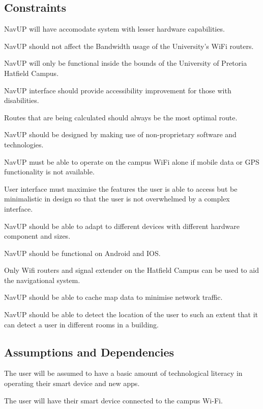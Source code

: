 \documentclass[12pt,a4paper]{article}
\begin{document}
	\subsection{Constraints}
		\begin{ConstraintEnum}
			\item NavUP will have accomodate system with lesser hardware capabilities.
			\item NavUP should not affect the Bandwidth usage of the University’s WiFi routers.
			\item NavUP will only be functional inside the bounds of the University of Pretoria Hatfield Campus.
			\item NavUP interface should provide accessibility improvement for those with disabilities.
			\item Routes that are being calculated should always be the most optimal route.
			\item NavUP should be designed by making use of non-proprietary software and technologies.
			\item NavUP must be able to operate on the campus WiFi alone if mobile data or GPS functionality is not available.
			\item User interface must maximise the features the user is able to access but be minimalistic in design so that the user is not overwhelmed by a complex interface.
			\item NavUP should be able to adapt to different devices with different hardware component and sizes.
			\item NavUP should be functional on Android and IOS.
			\item Only Wifi routers and signal extender on the Hatfield Campus can be used to aid the navigational system.
			\item NavUP should be able to cache map data to minimise network traffic.
			\item NavUP should be able to detect the location of the user to such an extent that it can detect a user in different rooms in a building.
		\end{ConstraintEnum}
	\subsection{Assumptions and Dependencies}
		\begin{AssumptionsEnum}
			\item The user will be assumed to have a basic amount of technological literacy in operating their smart device and new apps.
		\end{AssumptionsEnum}
		\begin{DependenciesEnum}
			\item The user will have their smart device connected to the campus Wi-Fi.
		\end{DependenciesEnum}
\end{document}
